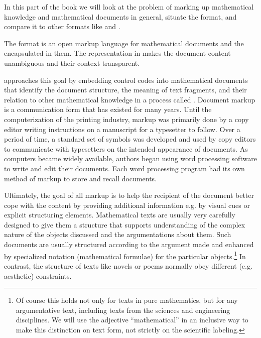 
\mockchapter
  In this part of the book we will look at the problem of marking up mathematical
  knowledge and mathematical documents in general, situate the {\omdoc} format, and
  compare it to other formats like {\openmath} and {\mathml}.

  The {\omdoc} format is an open markup language for mathematical documents and the
   encapsulated in them. The representation in
  {\omdoc} makes the document content unambiguous and their context transparent.

  {\omdoc} approaches this goal by embedding control codes into mathematical documents
  that identify the document structure, the meaning of text fragments, and their relation
  to other mathematical knowledge in a process called {\emph{}}.
  Document markup is a communication form that has existed for many years. Until the
  computerization of the printing industry, markup was primarily done by a copy editor
  writing instructions on a manuscript for a typesetter to follow. Over a period of time,
  a standard set of symbols was developed and used by copy editors to communicate with
  typesetters on the intended appearance of documents. As computers became widely
  available, authors began using word processing software to write and edit their
  documents.  Each word processing program had its own method of markup to store and
  recall documents.

  Ultimately, the goal of all markup is to help the recipient of the document better cope
  with the content by providing additional information e.g. by visual cues or explicit
  structuring elements. Mathematical texts are usually very carefully designed to give
  them a structure that supports understanding of the complex nature of the objects
  discussed and the argumentations about them.  Such documents are usually structured
  according to the argument made and enhanced by specialized notation (mathematical
  formulae) for the particular objects.\footnote{Of course this holds not only for texts
    in pure mathematics, but for any argumentative text, including texts from the sciences
    and engineering disciplines.  We will use the adjective ``mathematical'' in an
    inclusive way to make this distinction on text form, not strictly on the scientific
    labeling.}  In contrast, the structure of texts like novels or poems normally obey
  different (e.g. aesthetic) constraints.

